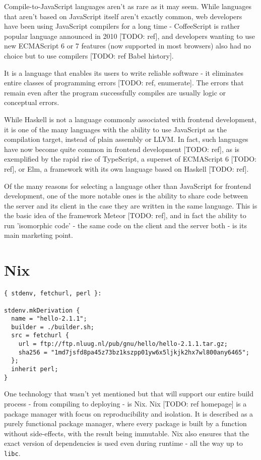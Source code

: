 \documentclass[english,odsaz]{fitthesis}
\begin{document}
Compile-to-JavaScript languages aren't as rare as it may seem. While languages
that aren't based on JavaScript itself aren't exactly common, web developers
have been using JavaScript compilers for a long time - CoffeeScript is rather
popular language announced in 2010 [TODO: ref], and developers wanting to use
new ECMAScript 6 or 7 features (now supported in most browsers) also had no
choice but to use compilers [TODO: ref Babel history].

It is a language that enables its users to write reliable software - it
eliminates entire classes of programming errors [TODO: ref, enumerate]. The
errors that remain even after the program successfully compiles are usually
logic or conceptual errors.

While Haskell is not a language commonly associated with frontend development,
it is one of the many languages with the ability to use JavaScript as the
compilation target, instead of plain assembly or LLVM. In fact, such languages
have now become quite common in frontend development [TODO: ref], as is
exemplified by the rapid rise of TypeScript, a superset of ECMAScript 6 [TODO:
ref], or Elm, a framework with its own language based on Haskell [TODO: ref].

Of the many reasons for selecting a language other than JavaScript for frontend
development, one of the more notable ones is the ability to share code between
the server and its client in the case they are written in the same
language. This is the basic idea of the framework Meteor [TODO: ref], and in
fact the ability to run 'isomorphic code' - the same code on the client and the
server both - is its main marketing point.

\section{Nix}
\label{sec:org15036ee}
\begin{verbatim}
{ stdenv, fetchurl, perl }:

stdenv.mkDerivation {
  name = "hello-2.1.1";
  builder = ./builder.sh;
  src = fetchurl {
    url = ftp://ftp.nluug.nl/pub/gnu/hello/hello-2.1.1.tar.gz;
    sha256 = "1md7jsfd8pa45z73bz1kszpp01yw6x5ljkjk2hx7wl800any6465";
  };
  inherit perl;
}
\end{verbatim}

One technology that wasn't yet mentioned but that will support our entire build
process - from compiling to deploying - is Nix. Nix [TODO: ref homepage] is a
package manager with focus on reproducibility and isolation. It is described as
a purely functional package manager, where every package is built by a function
without side-effects, with the result being immutable. Nix also ensures that the
exact version of dependencies is used even during runtime - all the way up to
\texttt{libc}.
\end{document}
